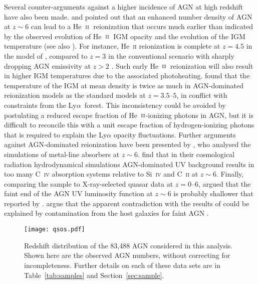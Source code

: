 \documentclass[fleqn,usenatbib]{mnras}
\def\lya{Ly$\alpha$~}
\def\HeII{\hbox{He~$\scriptstyle\rm II$}}
\begin{document}
Several counter-arguments against a higher incidence of AGN at high
redshift have also been made. \citet{2017MNRAS.468.4691D} and
\citet{2018MNRAS.473.1416M} pointed out that an enhanced number
density of AGN at $z\sim 6$ can lead to a \HeII\ reionization that
occurs much earlier than indicated by the observed evolution of
\HeII\ IGM opacity \citep{2011ApJ...733L..24W, 2016ApJ...825..144W}
and the evolution of the IGM temperature \citep{2011MNRAS.410.1096B,
  2014MNRAS.441.1916B} (see also \citealt{2017MNRAS.471..255K}).  For
instance, He~\textsc{ii} reionization is complete at $z=4.5$ in the
model of \citet{2015ApJ...813L...8M}, compared to $z=3$ in the
conventional scenario with sharply dropping AGN emissivity at $z>2$
\citep{2012ApJ...746..125H}.  Such early \HeII\ reionization will also
result in higher IGM temperatures due to the associated photoheating.
\citet{2017MNRAS.468.4691D} found that the temperature of the IGM at
mean density is twice as much in AGN-dominated reionization models as
the standard models at $z=3.5$--$5$, in conflict with constraints from
the \lya forest.  This inconsistency could be avoided by postulating a
reduced escape fraction of \HeII-ionizing photons in AGN, but it is
difficult to reconcile this with a unit escape fraction of
hydrogen-ionizing photons that is required to explain the Ly$\alpha$
opacity fluctuations.  Further arguments against AGN-dominated
reionization have been presented by \citet{2016MNRAS.459.2299F}, who
analysed the simulations of metal-line absorbers at $z\sim 6$.
\citet{2016MNRAS.459.2299F} find that in their cosmological radiation
hydrodynamical simulations AGN-dominated UV background results in too
many C~\textsc{iv} absorption systems relative to Si~\textsc{iv} and
C~\textsc{ii} at $z\sim 6$.  Finally, comparing the
\citet{2015AA...578A..83G} sample to X-ray-selected quasar data at
$z=0$--$6$, \citet{2017MNRAS.465.1915R} argued that the faint end of
the AGN UV luminosity function at $z\sim 6$ is probably shallower that
reported by \citet{2015AA...578A..83G}.  \citet{2017MNRAS.465.1915R}
argue that the apparent contradiction with the results of
\citet{2015AA...578A..83G} could be explained by contamination from
the host galaxies for faint AGN \citep[see
  also][]{2015MNRAS.453.1946G,2015MNRAS.448.3167W,2016MNRAS.463..348V}.

\begin{figure*}
  \begin{center}
    \texttt{[image: qsos.pdf]}
  \end{center}
  \caption{Redshift distribution of the 83,488 AGN considered in this
    analysis.  Shown here are the observed AGN numbers, without
    correcting for incompleteness.  Further details on each of these
    data sets are in Table~\ref{tab:samples} and
    Section~\ref{sec:sample}.}
  \label{fig:qsos}
\end{figure*}
\end{document}
